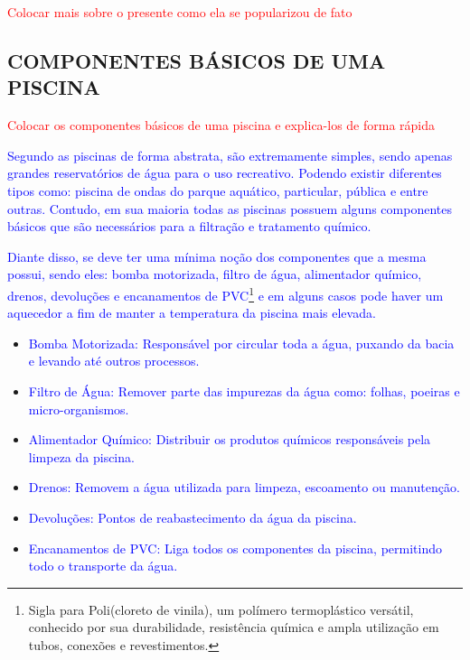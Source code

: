         \textcolor{red}{Colocar mais sobre o presente como ela se popularizou de fato}

    \subsection{COMPONENTES BÁSICOS DE UMA PISCINA}
        \textcolor{red}{Colocar os componentes básicos de uma piscina e explica-los de forma rápida}
    
        \textcolor{blue}{Segundo \cite{refComponents} as piscinas de forma abstrata, são extremamente simples, sendo apenas grandes reservatórios de água para o uso recreativo. Podendo existir diferentes tipos como: piscina de ondas do parque aquático, particular, pública e entre outras. Contudo, em sua maioria todas as piscinas possuem alguns componentes básicos que são necessários para a filtração e tratamento químico.}

        \textcolor{blue}{Diante disso, se deve ter uma mínima noção dos componentes que a mesma possui, sendo eles: bomba motorizada, filtro de água, alimentador químico, drenos, devoluções e encanamentos de PVC\footnote{Sigla para Poli(cloreto de vinila), um polímero termoplástico versátil, conhecido por sua durabilidade, resistência química e ampla utilização em tubos, conexões e revestimentos.} e em alguns casos pode haver um aquecedor a fim de manter a temperatura da piscina mais elevada.}

        \begin{itemize}
        
            \item \textcolor{blue}{Bomba Motorizada:}
                \textcolor{blue}{Responsável por circular toda a água, puxando da bacia e levando até outros processos.}

            \item \textcolor{blue}{Filtro de Água:}
                \textcolor{blue}{Remover parte das impurezas da água como: folhas, poeiras e micro-organismos.}

            \item \textcolor{blue}{Alimentador Químico:}
                \textcolor{blue}{Distribuir os produtos químicos responsáveis pela limpeza da piscina.}

            \item \textcolor{blue}{Drenos:}
                \textcolor{blue}{Removem a água utilizada para limpeza, escoamento ou manutenção.}

            \item \textcolor{blue}{Devoluções:}
                \textcolor{blue}{Pontos de reabastecimento da água da piscina.}

            \item \textcolor{blue}{Encanamentos de PVC:}
                \textcolor{blue}{Liga todos os componentes da piscina, permitindo todo o transporte da água.}
                
        \end{itemize}

